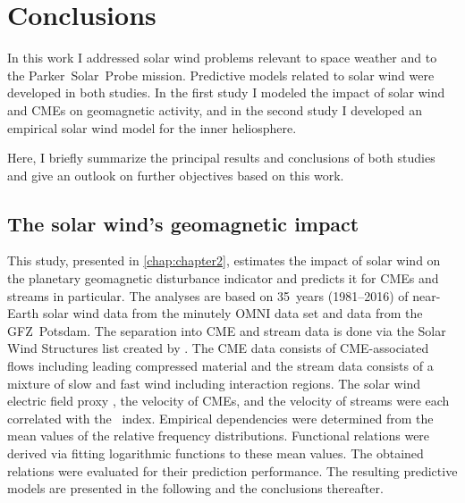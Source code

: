 
\chapter{Conclusions}
\label{chap:summary}

In this work I addressed solar wind problems relevant to space weather and to the Parker~Solar~Probe mission. Predictive models related to solar wind were developed in both studies. In the first study I modeled the impact of solar wind and CMEs on geomagnetic activity, and in the second study I developed an empirical solar wind model for the inner heliosphere.

Here, I briefly summarize the principal results and conclusions of both studies and give an outlook on further objectives based on this work.

\section{The solar wind's geomagnetic impact}
This study, presented in \autoref{chap:chapter2}, estimates the impact of solar wind on the planetary geomagnetic disturbance indicator \Kp{} and predicts it for CMEs and streams in particular.
The analyses are based on 35~years (1981--2016) of near-Earth solar wind data from the minutely OMNI data set and \Kp{} data from the GFZ~Potsdam. The separation into CME and stream data is done via the Solar Wind Structures list created by \citet{Richardson2000}. The CME data consists of CME-associated flows including leading compressed material and the stream data consists of a mixture of slow and fast wind including interaction regions. The solar wind electric field proxy \vBz{}, the velocity of CMEs, and the velocity of streams were each correlated with the \Kp~index. Empirical dependencies were determined from the mean values of the relative \Kp{} frequency distributions. Functional relations were derived via fitting logarithmic functions to these mean \Kp{} values.
The obtained \Kp{} relations were evaluated for their prediction performance. The resulting predictive models are presented in the following and the conclusions thereafter.

\bigskip


